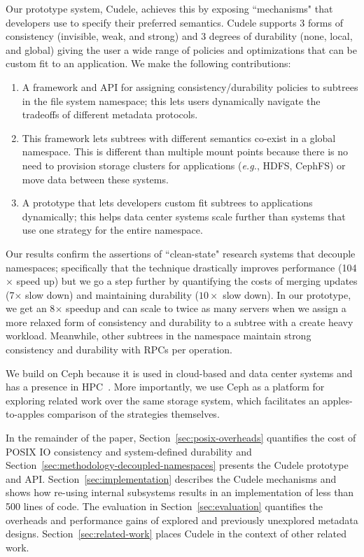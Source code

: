Our prototype system, Cudele, achieves this by exposing ``mechanisms" that
developers use to specify their preferred semantics.  Cudele supports 3 forms
of consistency (invisible, weak, and strong) and 3 degrees of durability (none,
local, and global) giving the user a wide range of policies and optimizations
that can be custom fit to an application. We make the following contributions:

\begin{enumerate}

  \item A framework and API for assigning consistency/durability policies 
  to subtrees in the file system namespace; this lets users dynamically navigate
  the tradeoffs of different metadata protocols.

  \item This framework lets subtrees with different semantics co-exist in a
  global namespace. This is different than multiple mount points because
  there is no need to provision storage clusters for applications
  ({\it e.g.}, HDFS, CephFS) or move data between these systems.

  \item A prototype that lets developers custom fit subtrees to applications
  dynamically; this helps data center systems scale further than systems that
  use one strategy for the entire namespace.

\end{enumerate}

Our results confirm the assertions of ``clean-state" research systems that
decouple namespaces; specifically that the technique drastically improves
performance (104\(\times\) speed up) but we go a step further by quantifying
the costs of merging updates (7\(\times\) slow down) and maintaining durability
(\(10\times\) slow down). In our prototype, we get an 8\(\times\) speedup and
can scale to twice as many servers when we assign a more relaxed form of
consistency and durability to a subtree with a create heavy workload.
Meanwhile, other subtrees in the namespace maintain strong consistency and
durability with RPCs per operation.

We build on Ceph because it is used in cloud-based and data center
systems and has a presence in HPC~\cite{}.  More importantly,  we use Ceph as a
platform for exploring related work over the same storage system, which
facilitates an apples-to-apples comparison of the strategies themselves.  

In the remainder of the paper, Section~\ref{sec:posix-overheads} quantifies the
cost of POSIX IO consistency and system-defined durability and
Section~\ref{sec:methodology-decoupled-namespaces} presents the Cudele
prototype and API. Section~\ref{sec:implementation} describes the Cudele
mechanisms and shows how re-using internal subsystems results in an
implementation of less than 500 lines of code. The evaluation in
Section~\ref{sec:evaluation} quantifies the overheads and performance gains of
explored and previously unexplored metadata designs.
Section~\ref{sec:related-work} places Cudele in the context of other related
work.

